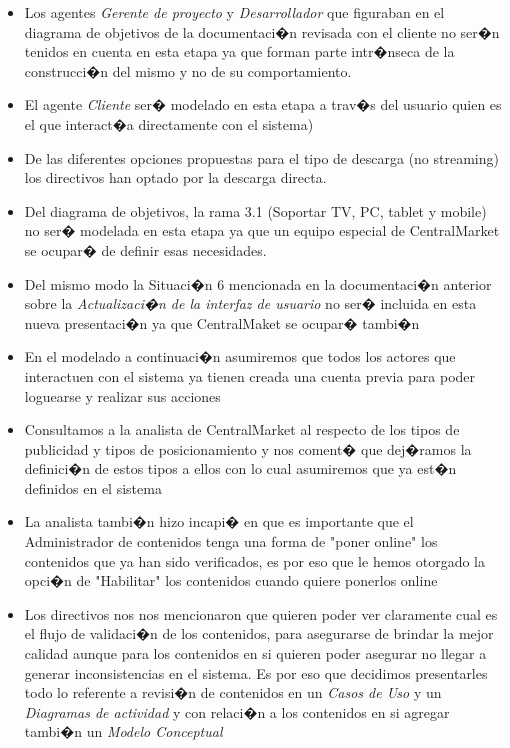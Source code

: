 \documentclass[11pt, a4paper, spanish]{article}
\begin{document}
\begin{itemize}
	
	\item{ Los agentes \emph{Gerente de proyecto} y \emph{Desarrollador} que figuraban en el diagrama de objetivos de la documentaci�n revisada con el cliente no 			ser�n tenidos en cuenta en esta etapa ya que forman parte intr�nseca de la construcci�n del mismo y no de su comportamiento.}

	\item{ El agente \emph{Cliente} ser� modelado en esta etapa a trav�s del usuario quien es el que interact�a directamente con el sistema)}

	\item{ De las diferentes opciones propuestas para el tipo de descarga (no streaming) los directivos han optado por la descarga directa.}
	
	\item{ Del diagrama de objetivos, la rama 3.1 (Soportar TV, PC, tablet y mobile) no ser� modelada en esta etapa ya que un equipo especial de CentralMarket
se ocupar� de definir esas necesidades.}

	\item{ Del mismo modo la Situaci�n 6 mencionada en la documentaci�n anterior sobre la \emph{Actualizaci�n de la interfaz de usuario} no ser� incluida en esta nueva presentaci�n ya que CentralMaket se ocupar� tambi�n }

	\item{ En el modelado a continuaci�n asumiremos que todos los actores que interactuen con el sistema ya tienen creada una cuenta previa para poder loguearse y realizar sus acciones }

	\item{ Consultamos a la analista de CentralMarket al respecto de los tipos de publicidad y tipos de posicionamiento y nos coment� que dej�ramos la definici�n de estos tipos a ellos con lo cual asumiremos que ya est�n definidos en el sistema}

	\item{ La analista tambi�n hizo incapi� en que es importante que el Administrador de contenidos tenga una forma de "poner online" los contenidos que 
ya han sido verificados, es por eso que le hemos otorgado la opci�n de "Habilitar" los contenidos cuando quiere ponerlos online}

	\item{ Los directivos nos nos mencionaron que quieren poder ver claramente cual es el flujo de validaci�n de los contenidos, para asegurarse de brindar
la mejor calidad aunque para los contenidos en si quieren poder asegurar no llegar a generar inconsistencias en el sistema. Es por eso que decidimos presentarles
todo lo referente a revisi�n de contenidos en un \emph{Casos de Uso} y un \emph{Diagramas de actividad} y con relaci�n a los contenidos en si agregar tambi�n un \emph{Modelo Conceptual}}


\end{itemize}
\end{document}

